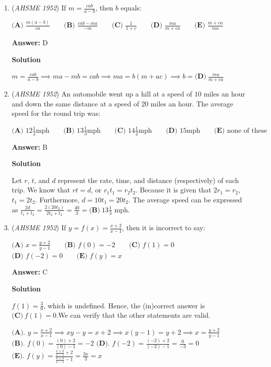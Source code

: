 \begin{enumerate}
	\item (\textit{AHSME 1952}) If $m=\frac{cab}{a-b}$, then $b$ equals:


 $\textbf{(A) \ }\frac{m(a-b)}{ca}  \qquad \textbf{(B) \ }\frac{cab-ma}{-m} \qquad \textbf{(C) \ }\frac{1}{1+c} \qquad \textbf{(D) \ }\frac{ma}{m+ca} \qquad \textbf{(E) \ }\frac{m+ca}{ma}$

 \textbf{Answer: }D



\textbf{Solution}

$m=\frac{cab}{a-b}\implies ma-mb=cab\implies ma=b(m+ac)\implies b=\boxed{\textbf{(D)}\ \frac{ma}{m+ca}}$



	\item (\textit{AHSME 1952}) An automobile went up a hill at a speed of $10$ miles an hour and down the same distance at a speed of $20$ miles an hour. The average speed for the round trip was:


 $\textbf{(A) \ }12\frac{1}{2}\text{mph}  \qquad \textbf{(B) \ }13\frac{1}{3}\text{mph} \qquad \textbf{(C) \ }14\frac{1}{2}\text{mph} \qquad \textbf{(D) \ }15\text{mph} \qquad \textbf{(E) \ }\text{none of these}$

 \textbf{Answer: }B



\textbf{Solution}

Let $r$, $t$, and $d$ represent the rate, time, and distance (respectively) of each trip. We know that $rt=d$, or $r_1t_1=r_2t_2$. Because it is given that $2r_1=r_2$, $t_1=2t_2$. Furthermore, $d=10t_1=20t_2$. The average speed can be expressed as $\frac{2d}{t_1+t_2}=\frac{2(20t_2)}{2t_2+t_2}=\frac{40}{3}=\boxed{\textbf{(B)}\ 13\frac{1}{3}\text{ mph}}$.

 


	\item (\textit{AHSME 1952}) If $y=f(x)=\frac{x+2}{x-1}$, then it is incorrect to say:


 $\textbf{(A)\ }x=\frac{y+2}{y-1}\qquad\textbf{(B)\ }f(0)=-2\qquad\textbf{(C)\ }f(1)=0\qquad$
$\textbf{(D)\ }f(-2)=0\qquad\textbf{(E)\ }f(y)=x$

 \textbf{Answer: }C



\textbf{Solution}

$f(1)=\frac{3}{0}$, which is undefined. Hence, the (in)correct answer is $\boxed{\textbf{(C)}\ f(1)=0}$.We can verify that the other statements are valid.

 $\textbf{(A).\ } y=\frac{x+2}{x-1}\implies xy-y=x+2\implies x(y-1)=y+2\implies x=\frac{y+2}{y-1}$
$\textbf{(B).\ } f(0)=\frac{(0)+2}{(0)-1}=-2$
$\textbf{(D).\ } f(-2)=\frac{(-2)+2}{(-2)-1}=\frac{0}{-3}=0$
$\textbf{(E).\ } f(y)=\frac{\frac{x+2}{x-1}+2}{\frac{x+2}{x-1}-1}=\frac{3x}{3}=x$




\end{enumerate}
